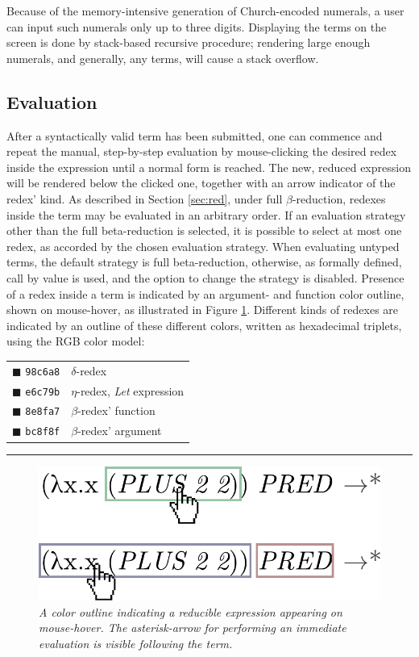 \documentclass[table, a4paper, 10pt]{book}
\begin{document}
Because of the memory-intensive generation of Church-encoded numerals, a user can input
such numerals only up to three digits. Displaying the terms on the screen is done
by stack-based recursive procedure; rendering large enough numerals, and generally, any terms,
will cause a stack overflow.

\subsection{Evaluation}\label{sec:eval}
After a syntactically valid term has been submitted, one can commence and repeat
the manual, step-by-step evaluation by
mouse-clicking the desired redex inside the expression until a normal form is reached.
The new, reduced expression will be rendered below the clicked one, together
with an arrow indicator of the redex' kind.
As described in Section \ref{sec:red},
under full $\beta$-reduction,
redexes inside the term may be evaluated in an arbitrary order.
If an evaluation strategy other than the full beta-reduction is selected, 
it is possible to select at most one redex, as accorded by the chosen evaluation strategy.
When evaluating untyped terms, the default strategy is full beta-reduction,
otherwise, as formally defined, call by value is used, and the option to change the 
strategy is disabled.
Presence of a redex inside a term is
indicated by an argument- and function color outline, shown on mouse-hover, as illustrated
in Figure \ref{redexfig}. Different kinds of redexes are indicated by an outline of these different colors,
written as hexadecimal triplets, using the RGB color model:
\begin{center}
\begin{tabular}{ll}
	{\color{delta}$\blacksquare$} \texttt{98c6a8}   &$\delta$-redex\\
	{\color{letexpr}$\blacksquare$} \texttt{e6c79b} &$\eta$-redex, \textit{Let} expression\\
	{\color{betaFunc}$\blacksquare$} \texttt{8e8fa7}&$\beta$-redex' function\\
	{\color{betaArg}$\blacksquare$} \texttt{bc8f8f} &$\beta$-redex' argument
\end{tabular}

\vspace{0.3cm}
\rule{7cm}{0.02cm}

\begin{figure}[H]\centering
\includegraphics[scale=0.5]{redexes.pdf}
\caption{\textit{A color outline indicating a reducible expression appearing on mouse-hover. The asterisk-arrow
for performing an immediate evaluation is visible following the term.}}\label{redexfig}
\end{figure}
\end{center}
\end{document}

